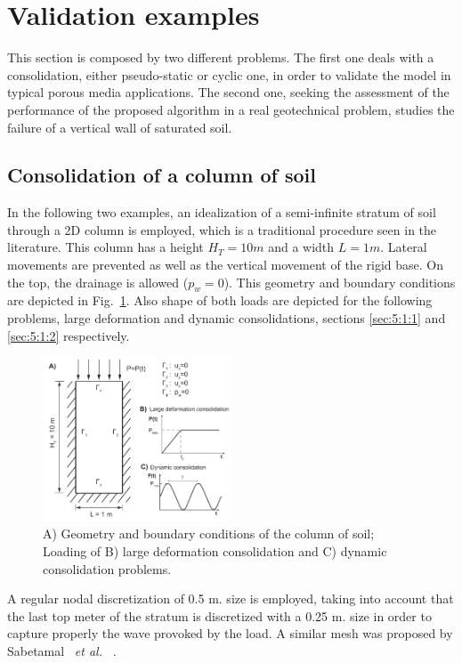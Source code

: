\documentclass[twocolumn]{svjour3}          %
\newcommand{\etal}{
  \textit{et al.}
}
\begin{document}
\section{Validation examples}
\label{sec:5}
This section is composed by two different problems. The first one deals with a consolidation, either pseudo-static or cyclic one, in order to validate the model in typical porous media applications. The second one, seeking the assessment of the performance of the proposed algorithm in a real geotechnical problem, studies the failure of a vertical wall of saturated soil.

\subsection{Consolidation of a column of soil}
\label{sec:5:1}
In the following two examples, an idealization of a semi-infinite stratum of soil through a 2D column is employed, which is a traditional procedure seen in the literature. This column has a height $H_T=10m$ and a width $L=1m$. Lateral movements are prevented as well as the vertical movement of the rigid base. On the top, the drainage is allowed ($p_w=0$). This geometry and boundary conditions are depicted in Fig.~\ref{fig:1}. Also shape of both loads are depicted for the following problems, large deformation and dynamic consolidations, sections \ref{sec:5:1:1} and \ref{sec:5:1:2} respectively.

\begin{figure}
  \includegraphics[width=0.5\textwidth]{Fig/col.pdf}
\caption{A) Geometry and boundary conditions of the column of soil;  Loading of B) large deformation consolidation and C) dynamic consolidation problems.}
\label{fig:1}       %
\end{figure}

A regular nodal discretization of 0.5 m. size is employed, taking into account that the last top meter of the stratum is discretized with a 0.25 m. size in order to capture properly the wave provoked by the load. A similar mesh was proposed by Sabetamal~\etal~\cite{Sabetamal:2015}. 
\end{document}
